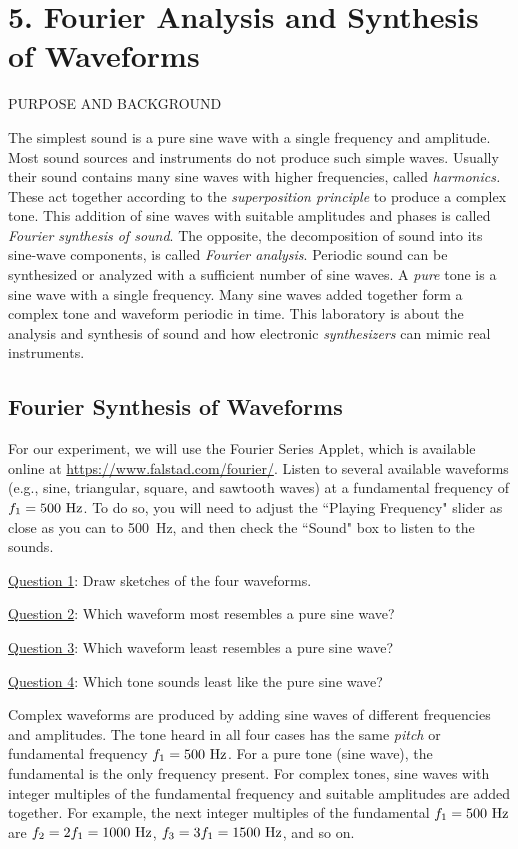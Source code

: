 \documentclass[11pt]{NSF}
\begin{document}
     
\section{5. Fourier Analysis and Synthesis of Waveforms}

PURPOSE AND BACKGROUND

The simplest sound is a pure sine wave with a single frequency and amplitude.
Most sound sources and instruments do not produce such simple waves. Usually
their sound contains many sine waves with higher frequencies, called {\em harmonics.}
These act together according to the {\em superposition principle} to produce a
complex tone. This addition of sine waves with suitable amplitudes and phases
is called {\em Fourier synthesis of sound}. 
The opposite, the decomposition of sound
into its sine-wave components, is called {\em Fourier analysis}. 
Periodic sound can
be synthesized or analyzed with a sufficient number of sine waves. 
A {\em pure} tone is a sine wave with a single frequency. 
Many sine waves added together form a
complex tone and waveform periodic in time. This laboratory is about the
analysis and synthesis of sound and how electronic 
{\em synthesizers} can mimic real instruments.

\subsection{Fourier Synthesis of Waveforms}

For our experiment, we will use the 
Fourier Series Applet, which is available online at 
\url{https://www.falstad.com/fourier/}.
Listen to several available waveforms (e.g.,  sine, triangular, 
square, and sawtooth waves) at a fundamental frequency of 
$f_1 = 500~{\rm Hz}$.
To do so, you will need to adjust the ``Playing Frequency" 
slider as close as you can to 500~Hz,  
and then check the ``Sound" box to listen to the sounds.

\underline{Question 1}: Draw sketches of the four waveforms.

\underline{Question 2}: Which waveform most resembles a pure sine wave?

\underline{Question 3}: Which waveform least resembles a pure sine wave?

\underline{Question 4}: Which tone sounds least like the pure sine wave?

Complex waveforms are produced by adding sine waves of different frequencies
and amplitudes. The tone heard in all four cases has the same {\em pitch} or
fundamental frequency $f_1= 500~{\rm Hz}$. For a pure tone (sine wave), the fundamental
is the only frequency present. For complex tones, sine waves with integer
multiples of the fundamental frequency and suitable amplitudes are added
together. For example, the next integer multiples of the fundamental 
$f_1 = 500~{\rm Hz}$ are 
$f_2 = 2 f_1= 1000~{\rm Hz}$, 
$f_3 = 3 f_1 = 1500~{\rm Hz}$, and so on.
\end{document}
